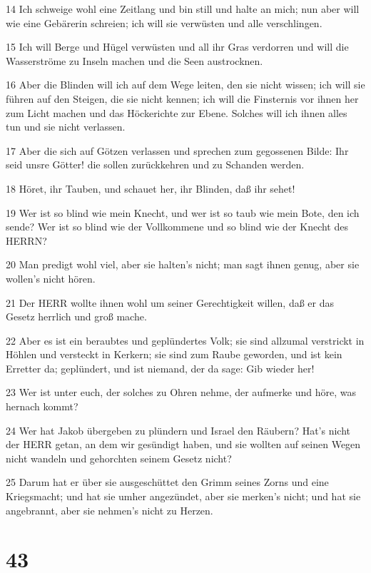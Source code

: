 \par 14 Ich schweige wohl eine Zeitlang und bin still und halte an mich; nun aber will wie eine Gebärerin schreien; ich will sie verwüsten und alle verschlingen.
\par 15 Ich will Berge und Hügel verwüsten und all ihr Gras verdorren und will die Wasserströme zu Inseln machen und die Seen austrocknen.
\par 16 Aber die Blinden will ich auf dem Wege leiten, den sie nicht wissen; ich will sie führen auf den Steigen, die sie nicht kennen; ich will die Finsternis vor ihnen her zum Licht machen und das Höckerichte zur Ebene. Solches will ich ihnen alles tun und sie nicht verlassen.
\par 17 Aber die sich auf Götzen verlassen und sprechen zum gegossenen Bilde: Ihr seid unsre Götter! die sollen zurückkehren und zu Schanden werden.
\par 18 Höret, ihr Tauben, und schauet her, ihr Blinden, daß ihr sehet!
\par 19 Wer ist so blind wie mein Knecht, und wer ist so taub wie mein Bote, den ich sende? Wer ist so blind wie der Vollkommene und so blind wie der Knecht des HERRN?
\par 20 Man predigt wohl viel, aber sie halten's nicht; man sagt ihnen genug, aber sie wollen's nicht hören.
\par 21 Der HERR wollte ihnen wohl um seiner Gerechtigkeit willen, daß er das Gesetz herrlich und groß mache.
\par 22 Aber es ist ein beraubtes und geplündertes Volk; sie sind allzumal verstrickt in Höhlen und versteckt in Kerkern; sie sind zum Raube geworden, und ist kein Erretter da; geplündert, und ist niemand, der da sage: Gib wieder her!
\par 23 Wer ist unter euch, der solches zu Ohren nehme, der aufmerke und höre, was hernach kommt?
\par 24 Wer hat Jakob übergeben zu plündern und Israel den Räubern? Hat's nicht der HERR getan, an dem wir gesündigt haben, und sie wollten auf seinen Wegen nicht wandeln und gehorchten seinem Gesetz nicht?
\par 25 Darum hat er über sie ausgeschüttet den Grimm seines Zorns und eine Kriegsmacht; und hat sie umher angezündet, aber sie merken's nicht; und hat sie angebrannt, aber sie nehmen's nicht zu Herzen.

\chapter{43}

